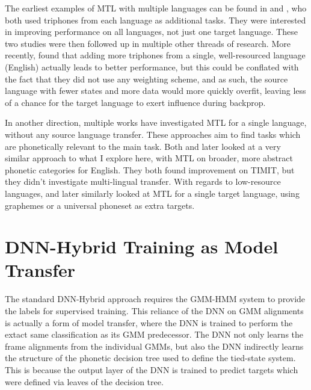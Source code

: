 \documentclass[a4paper]{article}
\begin{document}
The earliest examples of MTL with multiple languages can be found in \cite{huang2013} and \cite{heigold2013}, who both used triphones from each language as additional tasks. They were interested in improving performance on all languages, not just one target language. These two studies were then followed up in multiple other threads of research. More recently, \cite{grezl2016} found that adding more triphones from a single, well-resourced language (English) actually leads to better performance, but this could be conflated with the fact that they did not use any weighting scheme, and as such, the source language with fewer states and more data would more quickly overfit, leaving less of a chance for the target language to exert influence during backprop.


In another direction, multiple works have investigated MTL for a single language, without any source language transfer. These approaches aim to find tasks which are phonetically relevant to the main task. Both \cite{seltzer2013} and later \cite{huang2015} looked at a very similar approach to what I explore here, with MTL on broader, more abstract phonetic categories for English. They both found improvement on TIMIT, but they didn't investigate multi-lingual transfer. With regards to low-resource languages, \cite{chen2014} and later \cite{chen2015} similarly looked at MTL for a single target language, using graphemes or a universal phoneset as extra targets.



\section{DNN-Hybrid Training as Model Transfer}

The standard DNN-Hybrid approach requires the GMM-HMM system to provide the labels for supervised training. This reliance of the DNN on GMM alignments is actually a form of model transfer, where the DNN is trained to perform the extact same classification as its GMM predecessor. The DNN not only learns the frame alignments from the individual GMMs, but also the DNN indirectly learns the structure of the phonetic decision tree used to define the tied-state system. This is because the output layer of the DNN is trained to predict targets which were defined via leaves of the decision tree.
\end{document}
